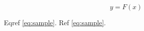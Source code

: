 \documentclass{article}
\begin{document}
\begin{equation}
y = F(x) \label{eq:sample}
\end{equation}

Eqref \eqref{eq:sample}.
Ref \ref{eq:sample}.
\end{document}
